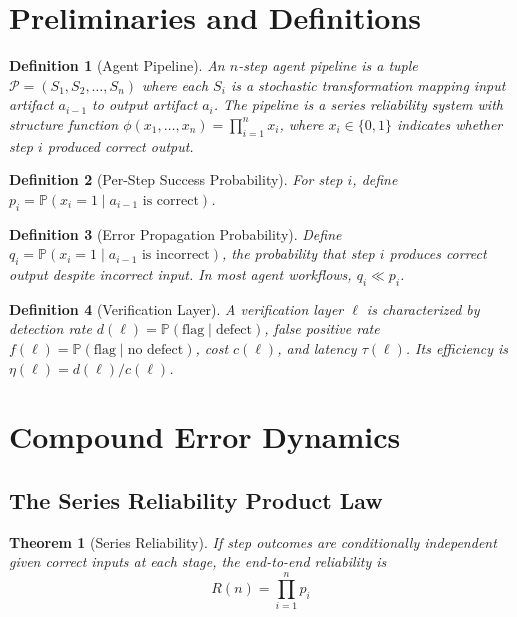 \documentclass[11pt, a4paper, logo, copyright]{googledeepmind}
\newtheorem{definition}{Definition}[section]
\newtheorem{theorem}{Theorem}[section]
\newcommand{\Prob}{\mathbb{P}}
\newcommand{\calP}{\mathcal{P}}
\begin{document}
\section{Preliminaries and Definitions}
\label{sec:prelim}

\begin{definition}[Agent Pipeline]
An \emph{$n$-step agent pipeline} is a tuple $\calP = (S_1, S_2, \ldots, S_n)$ where each $S_i$ is a stochastic transformation mapping input artifact $a_{i-1}$ to output artifact $a_i$.
The pipeline is a \emph{series reliability system} with structure function
$\phi(x_1, \ldots, x_n) = \prod_{i=1}^{n} x_i$,
where $x_i \in \{0,1\}$ indicates whether step $i$ produced correct output.
\end{definition}

\begin{definition}[Per-Step Success Probability]
For step $i$, define $p_i = \Prob(x_i = 1 \mid a_{i-1} \text{ is correct})$.
\end{definition}

\begin{definition}[Error Propagation Probability]
Define $q_i = \Prob(x_i = 1 \mid a_{i-1} \text{ is incorrect})$, the probability that step $i$ produces correct output despite incorrect input.
In most agent workflows, $q_i \ll p_i$.
\end{definition}

\begin{definition}[Verification Layer]
A \emph{verification layer} $\ell$ is characterized by detection rate $d(\ell) = \Prob(\text{flag} \mid \text{defect})$, false positive rate $f(\ell) = \Prob(\text{flag} \mid \text{no defect})$, cost $c(\ell)$, and latency $\tau(\ell)$.
Its \emph{efficiency} is $\eta(\ell) = d(\ell) / c(\ell)$.
\end{definition}

\section{Compound Error Dynamics}
\label{sec:compound}

\subsection{The Series Reliability Product Law}

\begin{theorem}[Series Reliability]
\label{thm:series}
If step outcomes are conditionally independent given correct inputs at each stage, the end-to-end reliability is
\begin{equation}
R(n) = \prod_{i=1}^{n} p_i
\end{equation}
\end{theorem}
\end{document}
